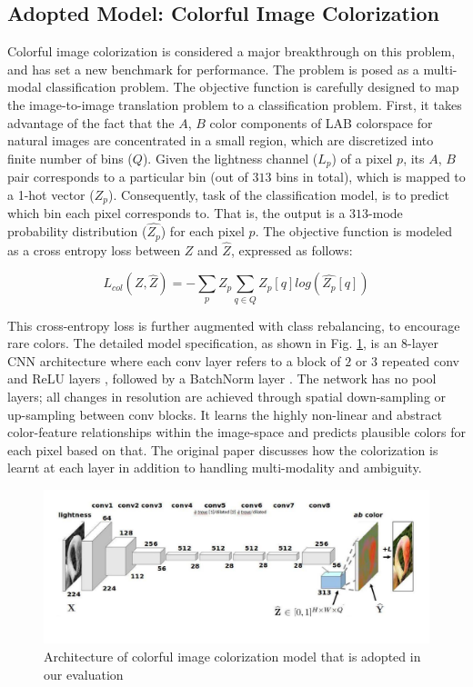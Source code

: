 \documentclass[10pt]{article}
\begin{document}
\subsection{\textbf{Adopted Model: Colorful Image Colorization}}
Colorful image colorization \cite{zhang2016colorful} is considered a major breakthrough on this problem, and has set a new benchmark for performance.
The problem is posed as a multi-modal classification problem. The objective function is carefully designed to map the image-to-image translation problem to a classification problem.
First, it takes advantage of the fact that the $A$, $B$ color components of LAB colorspace for natural images are concentrated in a small region, which are discretized into finite number of bins ($Q$). 
Given the lightness channel ($L_p$) of a pixel $p$, its $A$, $B$ pair corresponds to a particular bin (out of $313$ bins in total), which is mapped to a 1-hot vector ($Z_p$). 
Consequently, task of the classification model, is to predict which bin each pixel corresponds to. That is, the output is a $313$-mode probability distribution ($ \hat{Z_p}$) for each pixel $p$.
The objective function is modeled as a cross entropy loss between $Z$ and $\hat{Z}$, expressed as follows: 

\[ L_{col}(Z, \hat{Z}) = - \sum_p Z_p \sum_{q \in Q} Z_p[q] log(\hat{Z_p}[q])   \] 

This cross-entropy loss is further augmented with class rebalancing, to encourage rare colors. The detailed model specification, as shown in Fig. \ref{fig:col_main}, is an 8-layer CNN architecture where each
conv layer refers to a block of $2$ or $3$ repeated conv and ReLU layers \cite{nair2010rectified}, followed by a BatchNorm layer \cite{ioffe2015batch}. The network has no pool layers; all changes in
resolution are achieved through spatial down-sampling or up-sampling between conv blocks. It learns the highly non-linear and abstract color-feature relationships within the image-space and predicts
plausible colors for each pixel based on that. The original paper discusses how the colorization is learnt at each layer in addition to handling multi-modality and ambiguity. 


\begin{figure}[h]
\centering
\includegraphics[width=0.8 \linewidth]{Figs/7.pdf} 
\vspace{-10mm}
\caption{Architecture of colorful image colorization model \cite{zhang2016colorful} that is adopted in our evaluation}
\label{fig:col_main}
\end{figure}  
\end{document}
